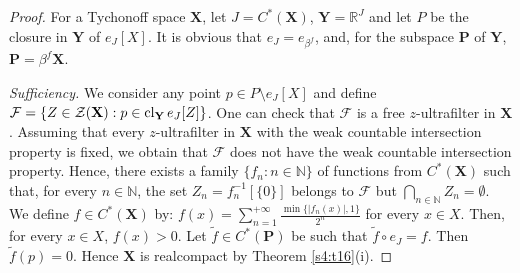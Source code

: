 \documentclass[12pt,twoside,leqno]{article}
\theoremstyle{plain}
\theoremstyle{definition}
\theoremstyle{remark}
\DeclareMathOperator{\cl}{{\rm cl}}
\begin{document}
\begin{proof}
	For a Tychonoff space $\mathbf{X}$, let $J=C^{\ast}(\mathbf{X})$, $\mathbf{Y}=\mathbb{R}^J$ and let $P$ be the closure in $\mathbf{Y}$ of $e_J[X]$. It is obvious that $e_J=e_{\beta^f}$, and, for the subspace $\mathbf{P}$ of $\mathbf{Y}$, $\mathbf{P}=\beta^{f}\mathbf{X}$.
	
	\textit{Sufficiency.} We consider any point $p\in P\setminus e_J[X]$ and define $\mathcal{F}=\{Z\in\mathcal{Z}(\mathbf{X}): p\in\cl_{\mathbf{Y}}e_J[Z]\}$. One can check that $\mathcal{F}$ is a free $z$-ultrafilter in $\mathbf{X}$. Assuming that every $z$-ultrafilter in $\mathbf{X}$ with the weak countable intersection property is fixed, we obtain that $\mathcal{F}$ does not have the weak countable intersection property. Hence, there exists a family $\{f_n: n\in\mathbb{N}\}$ of functions from $C^{\ast}(\mathbf{X})$ such that, for every $n\in\mathbb{N}$, the set $Z_n=f_n^{-1}[\{0\}]$ belongs to $\mathcal{F}$ but $\bigcap\limits_{n\in\mathbb{N}}Z_n=\emptyset$. We define $f\in C^{\ast}(\mathbf{X})$ by: $f(x)=\sum\limits_{n=1}^{+\infty}\frac{\min\{|f_n(x)|, 1\}}{2^n}$ for every $x\in X$. Then, for every $x\in X$, $f(x)>0$. Let $\tilde{f}\in C^{\ast}(\mathbf{P})$ be such that $\tilde{f}\circ e_J=f$. Then $\tilde{f}(p)=0$. Hence $\mathbf{X}$ is realcompact by Theorem \ref{s4:t16}(i).
	

\end{proof}
\end{document}
